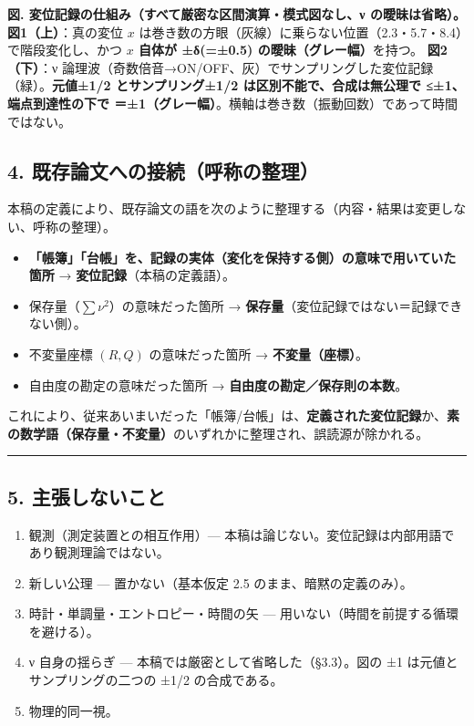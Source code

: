 \documentclass[
]{ltjsarticle}
\providecommand{\tightlist}{%
  \setlength{\itemsep}{0pt}\setlength{\parskip}{0pt}}
\begin{document}
\textbf{図. 変位記録の仕組み（すべて厳密な区間演算・模式図なし、ν
の曖昧は省略）。} \textbf{図1（上）}：真の変位 \(x\)
は巻き数の方眼（灰線）に乗らない位置（2.3・5.7・8.4）で階段変化し、かつ
\textbf{\(x\) 自体が ±δ(=±0.5) の曖昧（グレー幅）}を持つ。
\textbf{図2（下）}：ν
論理波（奇数倍音→ON/OFF、灰）でサンプリングした変位記録（緑）。\textbf{元値±1/2
とサンプリング±1/2 は区別不能で、合成は無公理で ≤±1、端点到達性の下で
＝±1（グレー幅）}。横軸は巻き数（振動回数）であって時間ではない。

\subsection{4.
既存論文への接続（呼称の整理）}\label{ux65e2ux5b58ux8ad6ux6587ux3078ux306eux63a5ux7d9aux547cux79f0ux306eux6574ux7406}

本稿の定義により、既存論文の語を次のように整理する（内容・結果は変更しない、呼称の整理）。

\begin{itemize}
\tightlist
\item
  \textbf{「帳簿」「台帳」を、記録の実体（変化を保持する側）の意味で用いていた箇所}
  → \textbf{変位記録}（本稿の定義語）。
\item
  保存量（\(\sum\nu^2\)）の意味だった箇所 →
  \textbf{保存量}（変位記録ではない＝記録できない側）。
\item
  不変量座標 \((R,Q)\) の意味だった箇所 → \textbf{不変量（座標）}。
\item
  自由度の勘定の意味だった箇所 → \textbf{自由度の勘定／保存則の本数}。
\end{itemize}

これにより、従来あいまいだった「帳簿/台帳」は、\textbf{定義された変位記録}か、\textbf{素の数学語（保存量・不変量）}のいずれかに整理され、誤読源が除かれる。

\begin{center}\rule{0.5\linewidth}{0.5pt}\end{center}

\subsection{5.
主張しないこと}\label{ux4e3bux5f35ux3057ux306aux3044ux3053ux3068}

\begin{enumerate}
\def\labelenumi{(\roman{enumi})}
\tightlist
\item
  観測（測定装置との相互作用）---
  本稿は論じない。変位記録は内部用語であり観測理論ではない。
\item
  新しい公理 --- 置かない（基本仮定 2.5 のまま、暗黙の定義のみ）。
\item
  時計・単調量・エントロピー・時間の矢 ---
  用いない（時間を前提する循環を避ける）。
\item
  ν 自身の揺らぎ --- 本稿では厳密として省略した（§3.3）。図の ±1
  は元値とサンプリングの二つの ±1/2 の合成である。
\item
  物理的同一視。
\end{enumerate}
\end{document}
